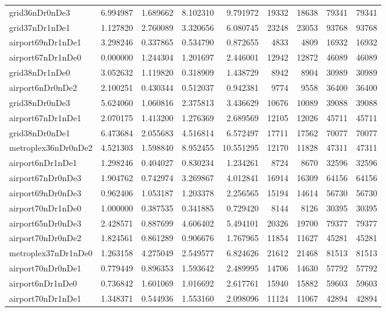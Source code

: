 \begin{longtable}{|l|r|r|r|r|r|r|r|r|}
grid36nDr0nDe3 & 6.994987 & 1.689662 & 8.102310 & 9.791972 & 19332 & 18638 & 79341 & 79341 \\
grid37nDr1nDe1 & 1.127820 & 2.760089 & 3.320656 & 6.080745 & 23248 & 23053 & 93768 & 93768 \\
airport69nDr1nDe1 & 3.298246 & 0.337865 & 0.534790 & 0.872655 & 4833 & 4809 & 16932 & 16932 \\
airport67nDr1nDe0 & 0.000000 & 1.244304 & 1.201697 & 2.446001 & 12942 & 12872 & 46089 & 46089 \\
grid38nDr1nDe0 & 3.052632 & 1.119820 & 0.318909 & 1.438729 & 8942 & 8904 & 30989 & 30989 \\
airport6nDr0nDe2 & 2.100251 & 0.430344 & 0.512037 & 0.942381 & 9774 & 9558 & 36400 & 36400 \\
grid38nDr0nDe3 & 5.624060 & 1.060816 & 2.375813 & 3.436629 & 10676 & 10089 & 39088 & 39088 \\
airport67nDr1nDe1 & 2.070175 & 1.413200 & 1.276369 & 2.689569 & 12105 & 12026 & 45711 & 45711 \\
grid38nDr0nDe1 & 6.473684 & 2.055683 & 4.516814 & 6.572497 & 17711 & 17562 & 70077 & 70077 \\
metroplex36nDr0nDe2 & 4.521303 & 1.598840 & 8.952455 & 10.551295 & 12170 & 11828 & 47311 & 47311 \\
airport6nDr1nDe1 & 1.298246 & 0.404027 & 0.830234 & 1.234261 & 8724 & 8670 & 32596 & 32596 \\
airport67nDr0nDe3 & 1.904762 & 0.742974 & 3.269867 & 4.012841 & 16914 & 16309 & 64156 & 64156 \\
airport69nDr0nDe3 & 0.962406 & 1.053187 & 1.203378 & 2.256565 & 15194 & 14614 & 56730 & 56730 \\
airport70nDr1nDe0 & 1.000000 & 0.387535 & 0.341885 & 0.729420 & 8144 & 8126 & 30395 & 30395 \\
airport65nDr0nDe3 & 2.428571 & 0.887699 & 4.606402 & 5.494101 & 20326 & 19700 & 79377 & 79377 \\
airport70nDr0nDe2 & 1.824561 & 0.861289 & 0.906676 & 1.767965 & 11854 & 11627 & 45281 & 45281 \\
metroplex37nDr1nDe0 & 1.263158 & 4.275049 & 2.549577 & 6.824626 & 21612 & 21468 & 81513 & 81513 \\
airport70nDr0nDe1 & 0.779449 & 0.896353 & 1.593642 & 2.489995 & 14706 & 14630 & 57792 & 57792 \\
airport6nDr1nDe0 & 0.736842 & 1.601069 & 1.016692 & 2.617761 & 15940 & 15882 & 59603 & 59603 \\
airport70nDr1nDe1 & 1.348371 & 0.544936 & 1.553160 & 2.098096 & 11124 & 11067 & 42894 & 42894 \\

\end{longtable}
